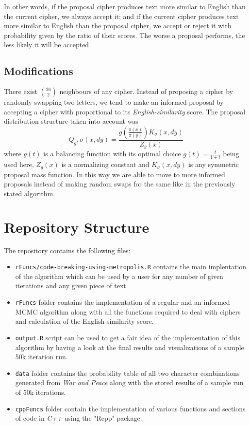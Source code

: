 \documentclass{article}
\begin{document}
In other words, if the proposal cipher produces text more similar to English than the current cipher, we always accept it; and if the current cipher produces text more similar to English than the proposal cipher, we accept or reject it with probability given by the ratio of their scores. The worse a proposal performs, the less likely it will be accepted

\subsection{Modifications}
There exist $26 \choose 2$ neighbours of any cipher. Instead of proposing a cipher by randomly swapping two letters, we tend to make an informed proposal by accepting a cipher with proportional to its \emph{English-similarity} score. The proposal distribution structure taken into account was $$Q_g,\sigma(x,dy) = \frac{g(\frac{\pi(x)}{\pi(y)})K_\sigma(x,dy)}{Z_g(x)}$$
where $g(t)$ is a balancing function with its optimal choice $g(t) = \frac{t}{1+t}$ being used here, $Z_g(x)$ is a normalizing constant and $K_\sigma(x,dy)$ is any symmetric proposal mass function. In this way we are able to move to more informed proposals instead of making random swaps for the same like in the previously stated algorithm. 

\section{Repository Structure}

The repository contains the following files:

\begin{itemize}
    \item \texttt{rFuncs/code-breaking-using-metropolis.R} contains the main implentation of the algorithm which can be used by a user for any number of given iterations and any given piece of text
    \item \texttt{rFuncs} folder contains the implementation of a regular and an informed MCMC algorithm along with all the functions required to deal with ciphers and calculation of the English similarity score.
    \item \texttt{output.R} script can be used to get a fair idea of the implementation of this algorithm by having a look at the final results and visualizations of a sample 50k iteration run.
    \item \texttt{data} folder contains the probability table of all two character combinations generated from \emph{War and Peace} along with the stored results of a sample run of 50k iterations.
    \item \texttt{cppFuncs} folder contain the implementation of various functions and sections of code in \emph{C++} using the "Rcpp" package.
\end{itemize}
\end{document}

